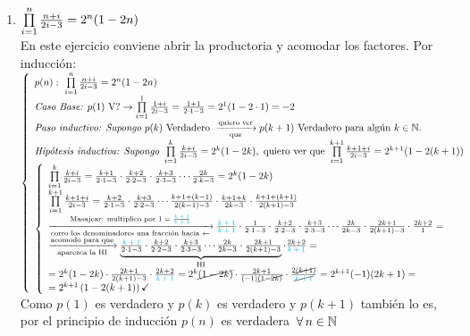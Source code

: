 \documentclass[12pt,a4paper, spanish]{article}
\begin{document}
\begin{enumerate}[label=\roman*)]
	\item
	      $\productoria{i=1}{n} \frac{n+i}{2i-3} = 2^n (1 -2n)$\\
	      En este ejercicio conviene abrir la productoria y acomodar los factores. Por inducción:\\
	      $\llave{l}{
			      p(n):\ \productoria{i=1}{n} \frac{n+i}{2i-3} = 2^n (1 -2n)  \\
			      \textit{Caso Base: } p(1) \text{ V?} \to \productoria{i=1}{1} \frac{1+i}{2i-3} = \frac{1+1}{2 \cdot 1 - 3} = 2^1 (1 - 2\cdot 1) = -2\\
			      \textit{Paso inductivo: Supongo } p(k) \text{ Verdadero } \flecha{quiero ver}[que] p(k+1) \text{ Verdadero para algún } k \en \naturales.\\
			      \textit{Hipótesis inductiva: Supongo } \productoria{i=1}{k} \frac{k+i}{2i-3} = 2^k (1 -2k), \qvq   \productoria{i=1}{k+1} \frac{k+1+i}{2i-3} = 2^{k+1} (1 -2(k+1))\\

			      \llave{l}{
				      \productoria{i=1}{k} \frac{k+i}{2i-3} = \frac{k+1}{2 \cdot 1 - 3} \cdot \frac{k+2}{2 \cdot 2 - 3} \cdot \frac{k+3}{2 \cdot 3 - 3} \cdots \frac{2k}{2 \cdot k - 3} = 2^k(1 - 2k)\\
				      \productoria{i=1}{k+1} \frac{k+1+i}{2i-3} = \frac{k+2}{2 \cdot 1 - 3} \cdot \frac{k+3}{2 \cdot 2 - 3} \cdots \frac{k+1 + (k-1)}{2(k-1) - 3} \cdot \frac{k+1 + k}{2k - 3}\cdot \frac{k+1 + (k+1)}{2(k + 1) - 3} \\
				      \flecha{Masajear: multiplico por $1 = \frac{\cyan{$k+1$}}{\cyan{$k+1$}}$}[corro los denominadores una fracción hacia $\leftarrow$]
				      \frac{\cyan{$k+1$}}{\cyan{$k+1$}} \cdot \frac{1}{2 \cdot 1 - 3} \cdot \frac{k+2}{2 \cdot 2 - 3} \cdot \frac{k + 3}{2 \cdot 3 - 3} \cdots \frac{2 k}{2k - 3} \cdot \frac{2k + 1}{2(k+1) - 3}  \cdot \frac{2k+2}{1} = \\
				      \flecha{acomodo para que}[aparezca la HI]
				      \HI{
					      \textstyle \frac{\cyan{$k+1$}}{2 \cdot 1 - 3} \cdot \frac{k+2}{2 \cdot 2 - 3} \cdot \frac{k + 3}{2 \cdot 3 - 3} \cdots \frac{2 k}{2k - 3} \cdot \frac{2k + 1}{2(k+1) - 3}
				      }  \cdot \frac{2k+2}{\cyan{$k+1$}} =\\
				      = 2^k (1 -2k) \cdot \frac{2k + 1}{2(k+1) - 3}  \cdot \frac{2k+2}{\cyan{$k+1$}} = 2^k \cancel{(1 - 2k)} \cdot \frac{2k + 1}{(-1)\cancel{(1 - 2k)}}  \cdot \frac{2\cancel{(k + 1)}}{\cancel{\cyan{$k + 1$}}} = 2^{k+1}(-1)(2k + 1)=\\
				      = 2^{k+1} \parentesis{1 - 2(k+1)} \checkmark

			      }
		      }$
	      Como $p(1)$ es verdadero y $p(k)$ es verdadero y $p(k+1)$ también lo es, por el principio de inducción $p(n)$ es verdadera $\paratodo n\en \naturales $
\end{enumerate}
\end{document}
